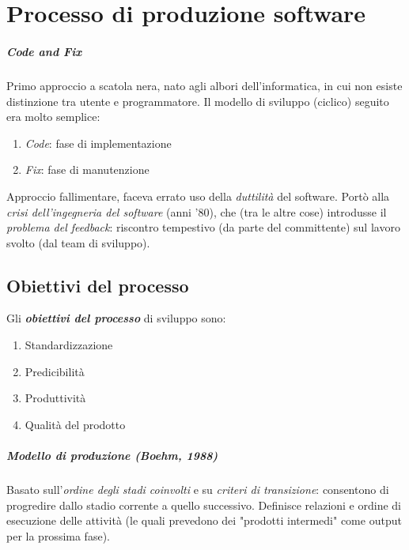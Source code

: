 \chapter{Processo di produzione software}

\paragraph{Code and Fix} Primo approccio a scatola nera, nato agli albori dell'informatica, in cui non esiste distinzione tra utente e programmatore.
Il modello di sviluppo (ciclico) seguito era molto semplice:
\begin{enumerate}
    \item \textit{Code}: fase di implementazione
    \item \textit{Fix}: fase di manutenzione
\end{enumerate}
Approccio fallimentare, faceva errato uso della \textit{duttilità} del software. Portò alla \textit{crisi dell'ingegneria del software} (anni '80), che (tra le altre cose) introdusse il \textit{problema del feedback}: riscontro tempestivo (da parte del committente) sul lavoro svolto (dal team di sviluppo).

\section{Obiettivi del processo}

Gli \textbf{\textit{obiettivi del processo}} di sviluppo sono:
\begin{enumerate}
    \item Standardizzazione
    \item Predicibilità
    \item Produttività
    \item Qualità del prodotto
\end{enumerate}

\paragraph{Modello di produzione (\textit{Boehm, 1988})} Basato sull'\textit{ordine degli stadi coinvolti} e su \textit{criteri di transizione}: consentono di progredire dallo stadio corrente a quello successivo. Definisce relazioni e ordine di esecuzione delle attività (le quali prevedono dei "prodotti intermedi" come output per la prossima fase).

